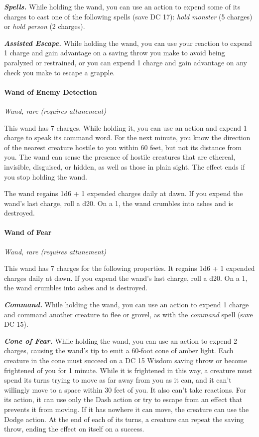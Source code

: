 \documentclass[
]{article}
\begin{document}
\emph{\textbf{Spells.}} While holding the wand, you can use an action to
expend some of its charges to cast one of the following spells (save DC
17): \emph{hold monster} (5 charges) or \emph{hold person} (2 charges).

\emph{\textbf{Assisted Escape.}} While holding the wand, you can use
your reaction to expend 1 charge and gain advantage on a saving throw
you make to avoid being paralyzed or restrained, or you can expend 1
charge and gain advantage on any check you make to escape a grapple.

\hypertarget{wand-of-enemy-detection}{%
\paragraph{Wand of Enemy Detection}\label{wand-of-enemy-detection}}

\emph{Wand, rare (requires attunement)}

This wand has 7 charges. While holding it, you can use an action and
expend 1 charge to speak its command word. For the next minute, you know
the direction of the nearest creature hostile to you within 60 feet, but
not its distance from you. The wand can sense the presence of hostile
creatures that are ethereal, invisible, disguised, or hidden, as well as
those in plain sight. The effect ends if you stop holding the wand.

The wand regains 1d6 + 1 expended charges daily at dawn. If you expend
the wand's last charge, roll a d20. On a 1, the wand crumbles into ashes
and is destroyed.

\hypertarget{wand-of-fear}{%
\paragraph{Wand of Fear}\label{wand-of-fear}}

\emph{Wand, rare (requires attunement)}

This wand has 7 charges for the following properties. It regains 1d6 + 1
expended charges daily at dawn. If you expend the wand's last charge,
roll a d20. On a 1, the wand crumbles into ashes and is destroyed.

\emph{\textbf{Command.}} While holding the wand, you can use an action
to expend 1 charge and command another creature to flee or grovel, as
with the \emph{command} spell (save DC 15).

\emph{\textbf{Cone of Fear.}} While holding the wand, you can use an
action to expend 2 charges, causing the wand's tip to emit a 60-foot
cone of amber light. Each creature in the cone must succeed on a DC 15
Wisdom saving throw or become frightened of you for 1 minute. While it
is frightened in this way, a creature must spend its turns trying to
move as far away from you as it can, and it can't willingly move to a
space within 30 feet of you. It also can't take reactions. For its
action, it can use only the Dash action or try to escape from an effect
that prevents it from moving. If it has nowhere it can move, the
creature can use the Dodge action. At the end of each of its turns, a
creature can repeat the saving throw, ending the effect on itself on a
success.
\end{document}
